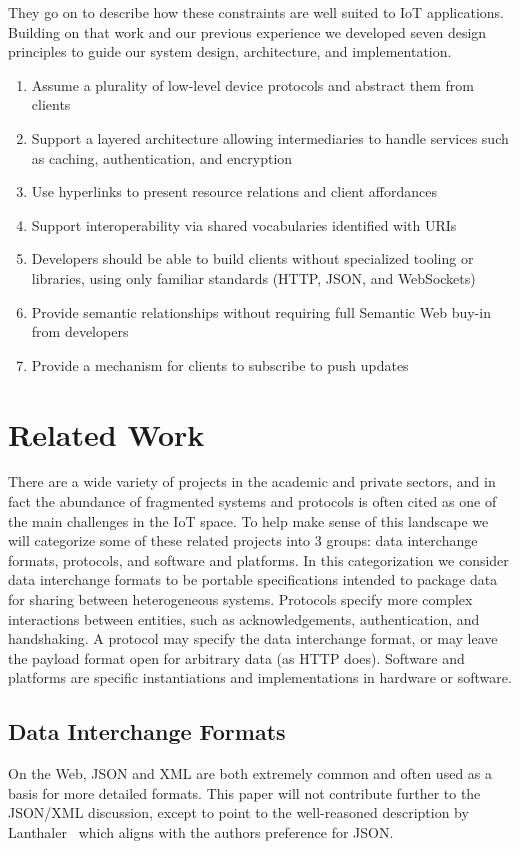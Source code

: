 \documentclass{acm_proc_article-sp}
\newenvironment{tightenumerate}{
    \vspace{-10pt}
    \begin{enumerate}
        \setlength{\parskip}{-1pt}}{
    \end{enumerate}
    \vspace{-10pt}}
\begin{document}
They go on to describe how these constraints are well suited to IoT
applications. Building on that work and our previous experience we developed
seven design principles to guide our system design, architecture, and
implementation.

\begin{tightenumerate}
    \item Assume a plurality of low-level device protocols and abstract them
        from clients
    \item Support a layered architecture allowing intermediaries to handle
        services such as caching, authentication, and encryption
    \item Use hyperlinks to present resource relations and client affordances
    \item Support interoperability via shared vocabularies identified with URIs
    \item Developers should be able to build clients without specialized
        tooling or libraries, using only familiar standards (HTTP, JSON, and
        WebSockets)
    \item Provide semantic relationships without requiring full Semantic Web
        buy-in from developers
    \item Provide a mechanism for clients to subscribe to push updates
\end{tightenumerate}

\section{Related Work}

There are a wide variety of projects in the academic and private sectors, and
in fact the abundance of fragmented systems and protocols is often cited as one
of the main challenges in the IoT space. To help make sense of this landscape
we will categorize some of these related projects into 3 groups: data
interchange formats, protocols, and software and platforms. In this
categorization we consider data interchange formats to be portable
specifications intended to package data for sharing between heterogeneous
systems. Protocols specify more complex interactions between entities, such as
acknowledgements, authentication, and handshaking. A protocol may specify the
data interchange format, or may leave the payload format open for arbitrary
data (as HTTP does). Software and platforms are specific instantiations and
implementations in hardware or software.

\subsection{Data Interchange Formats} On the Web, JSON and XML are both
extremely common and often used as a basis for more detailed formats. This
paper will not contribute further to the JSON/XML discussion, except to point
to the well-reasoned description by Lanthaler~\cite{semaphobia} which aligns
with the authors preference for JSON.
\end{document}
